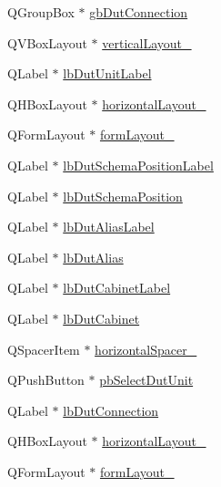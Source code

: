 \begin{DoxyCompactItemize}
Q\-Group\-Box $\ast$ \hyperlink{class_ui__mdt_tt_test_link_dialog_a2590ac65204df0f0e27d7002fab2dea1}{gb\-Dut\-Connection}
\item 
Q\-V\-Box\-Layout $\ast$ \hyperlink{class_ui__mdt_tt_test_link_dialog_aeb75fc4b10ee89cd07501e9aec3d8f8a}{vertical\-Layout\-\_}
\item 
Q\-Label $\ast$ \hyperlink{class_ui__mdt_tt_test_link_dialog_a68b1a69da30ed13839fc51c40114a2da}{lb\-Dut\-Unit\-Label}
\item 
Q\-H\-Box\-Layout $\ast$ \hyperlink{class_ui__mdt_tt_test_link_dialog_abe2a762a5cb03dff5b24324656c85dc0}{horizontal\-Layout\-\_}
\item 
Q\-Form\-Layout $\ast$ \hyperlink{class_ui__mdt_tt_test_link_dialog_a79bab5ff33988564add3f13d13972034}{form\-Layout\-\_}
\item 
Q\-Label $\ast$ \hyperlink{class_ui__mdt_tt_test_link_dialog_a4f1204263363d26678290b4e8260e9c4}{lb\-Dut\-Schema\-Position\-Label}
\item 
Q\-Label $\ast$ \hyperlink{class_ui__mdt_tt_test_link_dialog_a432cc3d990ac644d1eaa04417b2bc25e}{lb\-Dut\-Schema\-Position}
\item 
Q\-Label $\ast$ \hyperlink{class_ui__mdt_tt_test_link_dialog_a53bb504fb37cb3c138169d24a22562c8}{lb\-Dut\-Alias\-Label}
\item 
Q\-Label $\ast$ \hyperlink{class_ui__mdt_tt_test_link_dialog_ae850af93e6ed662dc9bf680e40d67d03}{lb\-Dut\-Alias}
\item 
Q\-Label $\ast$ \hyperlink{class_ui__mdt_tt_test_link_dialog_a5a3ed51f599ebb82a7789be0bc4a4736}{lb\-Dut\-Cabinet\-Label}
\item 
Q\-Label $\ast$ \hyperlink{class_ui__mdt_tt_test_link_dialog_aed0b4ca19ecbb6d658040d54b0f146b9}{lb\-Dut\-Cabinet}
\item 
Q\-Spacer\-Item $\ast$ \hyperlink{class_ui__mdt_tt_test_link_dialog_a3d5e185d67539230b8c9b96e53aef018}{horizontal\-Spacer\-\_}
\item 
Q\-Push\-Button $\ast$ \hyperlink{class_ui__mdt_tt_test_link_dialog_afe9a255ad456ab5e114ba7de1aa70fc7}{pb\-Select\-Dut\-Unit}
\item 
Q\-Label $\ast$ \hyperlink{class_ui__mdt_tt_test_link_dialog_a4b857f0b1b38c97452223753c30628f2}{lb\-Dut\-Connection}
\item 
Q\-H\-Box\-Layout $\ast$ \hyperlink{class_ui__mdt_tt_test_link_dialog_acd19484fc8f124d7b5fe9a9a54196d71}{horizontal\-Layout\-\_}
\item 
Q\-Form\-Layout $\ast$ \hyperlink{class_ui__mdt_tt_test_link_dialog_ae48aaae719e4b0147bc3da94455ece5f}{form\-Layout\-\_}

\end{DoxyCompactItemize}
